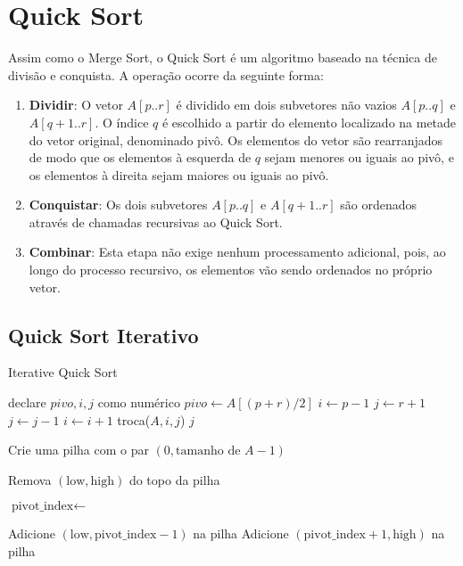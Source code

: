 \section{Quick Sort}
\label{sec:quick-sort-teo}

Assim como o Merge Sort, o Quick Sort é um algoritmo baseado na técnica de divisão e conquista. A operação ocorre da seguinte forma:

\begin{enumerate}
	\item \textbf{Dividir}: O vetor \( A[p..r] \) é dividido em dois subvetores não vazios \( A[p..q] \) e \( A[q+1..r] \). O índice \( q \) é escolhido a partir do elemento localizado na metade do vetor original, denominado pivô. Os elementos do vetor são rearranjados de modo que os elementos à esquerda de \( q \) sejam menores ou iguais ao pivô, e os elementos à direita sejam maiores ou iguais ao pivô.

	\item \textbf{Conquistar}: Os dois subvetores \( A[p..q] \) e \( A[q+1..r] \) são ordenados através de chamadas recursivas ao Quick Sort.

	\item \textbf{Combinar}: Esta etapa não exige nenhum processamento adicional, pois, ao longo do processo recursivo, os elementos vão sendo ordenados no próprio vetor.
\end{enumerate}

\subsection{Quick Sort Iterativo}

\begin{algorithm}
	\caption{Iterative Quick Sort}
	\label{algo:iterative_quick_sort}
	\begin{algorithmic}[1]
		\Statex

		\State declare $pivo, i, j$ como numérico
		\State $pivo \gets A[(p + r) / 2]$
		\State $i \gets p - 1$
		\State $j \gets r + 1$
		\Repeat
		\State $j \gets j - 1$
		\Repeat
		\State $i \gets i + 1$
		\State troca($A, i, j$)
		\EndIf
		\EndWhile
		\State \Return $j$
		\EndFunction
		\Statex

		\State \Return
		\EndIf
		\State Crie uma pilha com o par $(0, \text{tamanho de } A - 1)$

		\State Remova $(\text{low}, \text{high})$ do topo da pilha

		\State $\text{pivot\_index} \gets$ 

		\State Adicione $(\text{low}, \text{pivot\_index} - 1)$ na pilha 
		\EndIf
		\State Adicione $(\text{pivot\_index} + 1, \text{high})$ na pilha 
		\EndIf
		\EndWhile
		\EndFunction
	\end{algorithmic}
\end{algorithm}
\FloatBarrier


